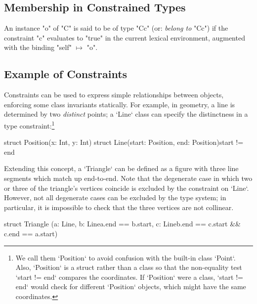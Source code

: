 \subsection{Membership in Constrained Types}

An instance \xcd"o" of \xcd"C" is said to be of type \xcd"C{c}" (or: {\em
belong to} \xcd"C{c}") if the constraint \xcd"c" evaluates to \xcd"true" in
the current lexical environment, augmented with the binding \xcd"self"
$\mapsto$ \xcd"o".



\subsection{Example of Constraints}



Constraints can be used to express simple relationships between objects,
enforcing some class invariants statically.  For example, in geometry, a line
is determined by two {\em distinct} points; a \xcd`Line` class can specify the
distinctness in a type constraint:\footnote{We call them
\xcd`Position` to avoid confusion with the built-in class \xcd`Point`. 
Also, \xcd`Position` is a struct rather than a class so that the non-equality
test \xcd`start != end` compares the coordinates.  If \xcd`Position` were a
class, \xcd`start != end` would check for different \xcd`Position` objects,
which might have the same coordinates.
}


\begin{xten}
struct Position(x: Int, y: Int) {}
struct Line(start: Position, end: Position){start != end} {}
\end{xten}


Extending this concept, a \xcd`Triangle` can be defined as a figure with three
line segments which match up end-to-end.  Note that the degenerate case in
which two or three of the triangle's vertices coincide is excluded by the
constraint on \xcd`Line`.  However, not all degenerate cases can be excluded
by the type system; in particular, it is impossible to check that the three
vertices are not collinear. 

% 
\begin{xten}
struct Triangle 
 (a: Line, 
  b: Line{a.end == b.start}, 
  c: Line{b.end == c.start && c.end == a.start})  
 {}
\end{xten}
%

